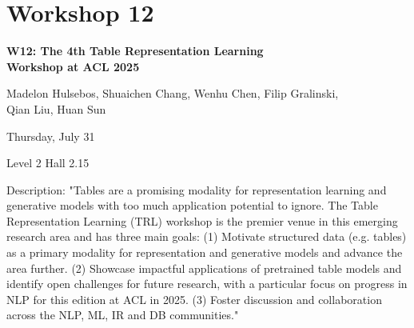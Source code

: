 \clearpage



\section[W12: The 4th Table Representation Learning \\
Workshop at ACL 2025]{Workshop 12}
\label{workshop_12}

\begin{center}
    {\Large \textbf{W12: The 4th Table Representation Learning \\
    Workshop at ACL 2025}}\\
    
 \vspace{5mm}

   Madelon Hulsebos, Shuaichen Chang, Wenhu Chen, Filip Gralinski, \\
   Qian Liu, Huan Sun\\

    \vspace{5mm}

    Thursday, July 31
    
   Level 2 Hall 2.15

\end{center}

Description: "Tables are a promising modality for representation learning and generative models with too much application potential to ignore. The Table Representation Learning (TRL) workshop is the premier venue in this emerging research area and has three main goals:
(1) Motivate structured data (e.g. tables) as a primary modality for representation and generative models and advance the area further.
(2) Showcase impactful applications of pretrained table models and identify open challenges for future research, with a particular focus on progress in NLP for this edition at ACL in 2025.
(3) Foster discussion and collaboration across the NLP, ML, IR and DB communities."


